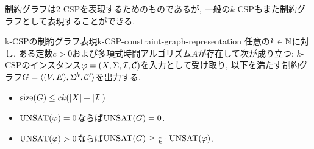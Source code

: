 制約グラフは2-CSPを表現するためのものであるが, 一般の$k$-CSPもまた制約グラフとして表現することができる.
\begin{lemma}{k-CSPの制約グラフ表現}{k-CSP-constraint-graph-representation}
  任意の$k\in\mathbb{N}$に対し, ある定数$c>0$および多項式時間アルゴリズム$A$が存在して次が成り立つ:
  $k$-CSPのインスタンス$\varphi=(X,\Sigma,\mathcal{I},\mathcal{C})$を入力として受け取り, 以下を満たす制約グラフ$G=\langle(V,E),\Sigma^k,\mathcal{C}'\rangle$を出力する.
  \begin{itemize}
    \item $\mathrm{size}(G) \le ck(\abs{X}+\abs{\mathcal{I}})$
    \item $\mathrm{UNSAT}(\varphi)=0$ならば$\mathrm{UNSAT}(G)=0$.
    \item $\mathrm{UNSAT}(\varphi)>0$ならば$\mathrm{UNSAT}(G) \ge \frac{1}{k}\cdot \mathrm{UNSAT}(\varphi)$.
  \end{itemize}
\end{lemma}
